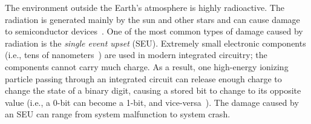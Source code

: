 The environment outside the Earth's atmosphere is highly radioactive. The radiation is generated mainly by the sun and other stars and can cause damage to semiconductor devices~\cite{fundamentals:space}. One of the most common types of damage caused by radiation is the \textit{single event upset} (SEU). Extremely small electronic components (i.e., tens of nanometers~\cite{intel:chip:size}) are used in modern integrated circuitry; the components cannot carry much charge. As a result, one high-energy ionizing particle passing through an integrated circuit can release enough charge to change the state of a binary digit, causing a stored bit to change to its opposite value (i.e., a 0-bit can become a 1-bit, and vice-versa~\cite{fundamentals:space}). The damage caused by an SEU can range from system malfunction to system crash.

